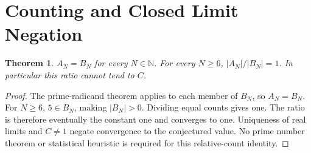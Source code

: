 \documentclass[11pt]{article}
\newtheorem{theorem}{Theorem}
\newcommand{\N}{\mathbb N}
\begin{document}
\section{Counting and Closed Limit Negation}
\begin{theorem}
$A_N=B_N$ for every $N\in\N$. For every $N\ge6$,
$|A_N|/|B_N|=1$. In particular this ratio cannot tend to $C$.
\end{theorem}
\begin{proof}
The prime-radicand theorem applies to each member of $B_N$, so $A_N=B_N$.
For $N\ge6$, $5\in B_N$, making $|B_N|>0$. Dividing equal counts gives
one. The ratio is therefore eventually the constant one and converges to one.
Uniqueness of real limits and $C\ne1$ negate convergence to the conjectured
value. No prime number theorem or statistical heuristic is required for this
relative-count identity.
\end{proof}
\end{document}
